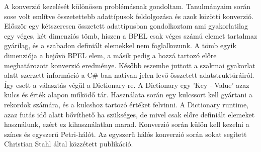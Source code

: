 A konverzió kezelését különösen problémásnak gondoltam. Tanulmányaim során sose volt említve összetettebb adattípusok feldolgozása és azok közötti konverzió. Először egy kétszeresen összetett adattípusban gondolkoztam ami gyakorlatilag egy véges, két dimenziós tömb, hiszen a BPEL csak véges számú elemet tartalmaz gyárilag, és a szabadon definiált elemekkel nem foglalkozunk. A tömb egyik dimenziója a bejővö BPEL elem, a másik pedig a hozzá tartozó előre meghatározott konverzió eredménye. Később eszembe juttott a szakmai gyakorlat alatt szerzett információ a C\# ban natívan jelen levő összetett adatstruktúráiról. Így esett a választás végül a Dictionary-re. A Dictionary egy 'Key - Value' azaz kulcs és érték alapon működő tár. Használata során egy kulcssort kell gyártani a rekordok számára, és a kulcshoz tartozó értéket felvinni. A Dictionary runtime, azaz futás idő alatt bővíthető ha szükséges, de mivel csak előre definiált elemeket használunk, ezért ez kihasználatlan marad. Konverzió során külön kell kezelni a színes és egyszerű Petri-hálót. Az egyszerű hálós konverzió során sokat segített Christian Stahl által közzétett publikáció\cite{bpelToPnet}.